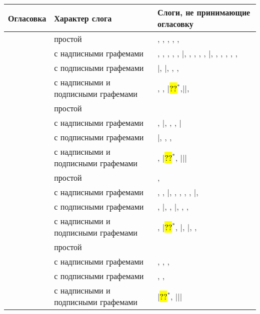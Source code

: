 \begin{tabularx}{\textwidth}{|L{3}|L{10}|L{17}|}
	\caption{Слоги, не принимающие огласовку}
	\label{tab:2}\\
		\hline
	Огла\-совка & Характер слога & Слоги, не принимающие огласовку\\
	\hline
	\endhead
	\rule{0cm}{5mm}
	 & простой & , , , , , \\
	& с надписными графемами & , , , , , |\quad  {}, , , , , |\quad {}, , , , , , \\
	\rule{0cm}{5mm}
	& с подписными графемами & |\quad {}, |\quad {}, , , \\
	\rule{0cm}{5mm}
	& с надписными и подписными графемами & , , |\quad \hl{??}\hyperref[tab:2:spec1]{$^*$},|\quad {}|\quad {},\\ 
	\hline
	\rule{0cm}{5mm}
	 & простой & \\
	& с надписными графемами & , |\quad {}, , , |\quad {}\\
	\rule{0cm}{5mm}
	& с подписными графемами & |\quad {}, , , \\
	\rule{0cm}{5mm}
	& с надписными и подписными графемами & , |\quad \hl{??}\hyperref[tab:2:spec1]{$^*$}, |\quad {}|\quad {}|\quad {}\\
	\hline
	\rule{0cm}{5mm}
	 & простой & , \\
	& с надписными графемами & , , |\quad {}, , , , , |\quad {}, \\
	\rule{0cm}{5mm}
	& с подписными графемами & , |\quad {}, , |\quad {}, , , \\
	\rule{0cm}{5mm}
	& с надписными и подписными графемами & , |\quad \hl{??}\hyperref[tab:2:spec1]{$^*$}, |\quad {}, |\quad {}, , \\
	\hline
	\rule{0cm}{5mm}
	 & простой & \\
	& с надписными графемами & , , , \\
	\rule{0cm}{5mm}
	& с подписными графемами & , , \\
	\rule{0cm}{5mm}
	& с надписными и подписными графемами & |\quad \hl{??}\hyperref[tab:2:spec1]{$^*$}, |\quad {}|\quad {}|\quad {}\\
	\hline
\end{tabularx}
